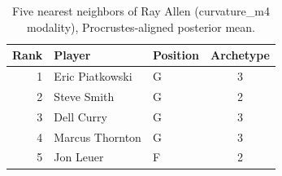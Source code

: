 \begin{table}[htbp]
  \centering\small
  \begin{tabular}{rllc}
    \toprule
    Rank & Player & Position & Archetype \\
    \midrule
    1 & Eric Piatkowski & G & 3 \\
    2 & Steve Smith & G & 2 \\
    3 & Dell Curry & G & 3 \\
    4 & Marcus Thornton & G & 3 \\
    5 & Jon Leuer & F & 2 \\
    \bottomrule
  \end{tabular}
  \caption{Five nearest neighbors of Ray Allen (curvature_m4 modality), Procrustes-aligned posterior mean.}
  \label{tab:Ray_Allen_neighbors_curvature_m4}
\end{table}

